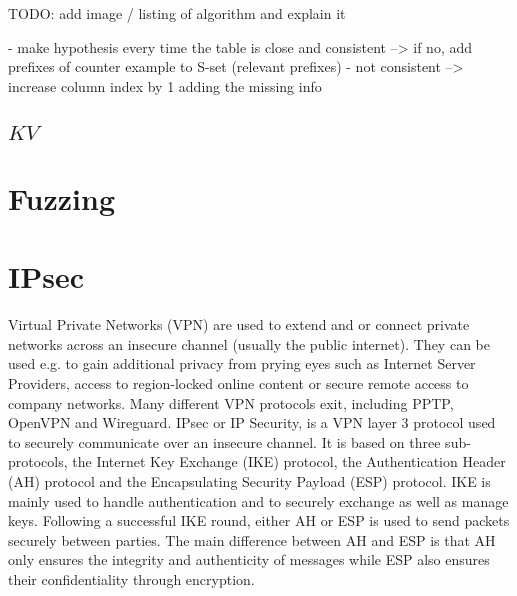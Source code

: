 TODO: add image / listing of algorithm and explain it

- make hypothesis every time the table is close and consistent --> if no, add prefixes of counter example to S-set (relevant prefixes)
- not consistent --> increase column index by 1 adding the missing info

\subsection{$KV$}



\section{Fuzzing}

\section{IPsec}

Virtual Private Networks (VPN) are used to extend and or connect private networks across an insecure channel (usually the public internet). They can be used e.g. to gain additional privacy from prying eyes such as Internet Server Providers, access to region-locked online content or secure remote access to company networks. Many different VPN protocols exit, including PPTP, OpenVPN and Wireguard. IPsec or IP Security, is a VPN layer 3 protocol used to securely communicate over an insecure channel. It is based on three sub-protocols, the Internet Key Exchange (IKE) protocol, the Authentication Header (AH) protocol and the Encapsulating Security Payload (ESP) protocol. IKE is mainly used to handle authentication and to securely exchange as well as manage keys. Following a successful IKE round, either AH or ESP is used to send packets securely between parties. The main difference between AH and ESP is that AH only ensures the integrity and authenticity of messages while ESP also ensures their confidentiality through encryption.

